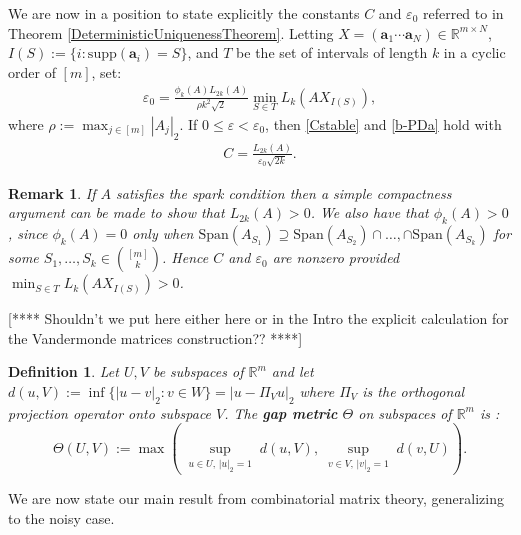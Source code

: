 \documentclass[journal, onecolumn]{IEEEtran}
\newtheorem{definition}{Definition}
\newtheorem{remark}{Remark}
\begin{document}
We are now in a position to state explicitly the constants $C$ and $\varepsilon_0$ referred to in Theorem \ref{DeterministicUniquenessTheorem}. Letting $X  = (\mathbf{a}_1 \cdots \mathbf{a}_N) \in \mathbb{R}^{m \times N}$, $I(S) := \{i : \text{supp}(\mathbf{a}_i) = S\}$, and $T$ be the set of intervals of length $k$ in a cyclic order of $[m]$, set:
\begin{align}\label{epsilon0}
\varepsilon_0 = \frac{ \phi_k(A) L_{2k}(A) }{\rho k^2 \sqrt{2}} \min_{S \in T} L_k(AX_{I(S)}),
\end{align}
where $\rho := \max_{j \in [m]} |A_j|_2 $. If $0 \leq \varepsilon < \varepsilon_0$, then \eqref{Cstable} and \eqref{b-PDa} hold with
\begin{align}\label{Cdef}
C = \frac{L_{2k}(A)}{ \varepsilon_0 \sqrt{2k}}.
\end{align}

\begin{remark}\label{nonzero}
If $A$ satisfies the spark condition then a simple compactness argument can be made to show that $L_{2k}(A) > 0$. We also have that $\phi_k(A) > 0$, since $\phi_k(A) = 0$ only when $\text{Span}(A_{S_1}) \supseteq \text{Span}(A_{S_2}) \cap \ldots, \cap \text{Span}(A_{S_k})$ for some $S_1, \ldots, S_k \in {[m] \choose k}$. Hence $C$ and $\varepsilon_0$ are nonzero provided $\min_{S \in T} L_k(AX_{I(S)}) > 0$. 
\end{remark}

[**** Shouldn't we put here either here or in the Intro the explicit calculation for the Vandermonde matrices construction?? ****]

\begin{definition}\label{GapMetricDef}
Let $U, V$ be subspaces of $\mathbb{R}^m$ and let $d(u,V) := \inf\{|u-v|_2: v \in W\} = |u - \Pi_V u|_2$ where $\Pi_V$ is the orthogonal projection operator onto subspace $V$. The \textbf{gap metric} $\Theta$ on subspaces of $\mathbb{R}^{m}$ is \cite{akhiezer2013theory}:
\begin{equation}\label{SubspaceMetric}
\Theta(U,V) := \max\left( \sup_{\substack{u \in U, \, |u|_2 = 1}} d(u,V), \sup_{\substack{v \in V, \, |v|_2 = 1}} d(v,U) \right).
\end{equation}
\end{definition}

We are now state our main result from combinatorial matrix theory, generalizing \cite[Lemma 1]{Hillar15} to the noisy case.
\end{document}
